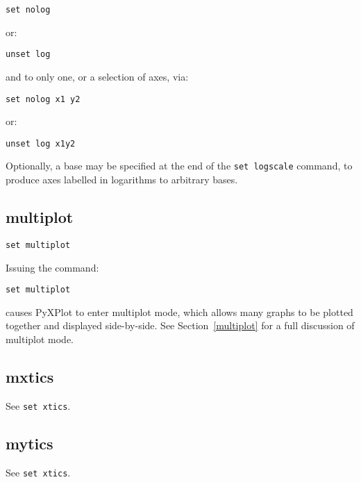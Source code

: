 \documentclass[a4paper,onecolumn,11pt]{book}
\begin{document}
\begin{verbatim}
set nolog
\end{verbatim}

\noindent or:

\begin{verbatim}
unset log
\end{verbatim}

\noindent and to only one, or a selection of axes, via:

\begin{verbatim}
set nolog x1 y2
\end{verbatim}

\noindent or:

\begin{verbatim}
unset log x1y2
\end{verbatim}

Optionally, a base may be specified at the end of the {\tt set logscale}
command, to produce axes labelled in logarithms to arbitrary bases.

\subsection{multiplot}

\begin{verbatim}
set multiplot
\end{verbatim}

Issuing the command:

\begin{verbatim}
set multiplot
\end{verbatim}

\noindent causes PyXPlot to enter multiplot mode, which allows many graphs to
be plotted together and displayed side-by-side. See Section~\ref{multiplot} for
a full discussion of multiplot mode.

\subsection{mxtics}

See {\tt set xtics}.

\subsection{mytics}

See {\tt set xtics}.
\end{document}
